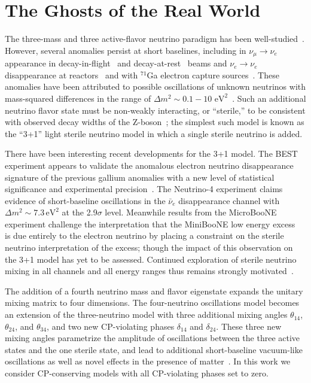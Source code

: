 \documentclass[main.tex]{subfiles}
\begin{document}
\section{The Ghosts of the Real World}
The three-mass and three active-flavor neutrino  paradigm has been well-studied~\cite{PhysRevD.98.030001,Esteban_2019,de_Salas_2018,Capozzi_2016,zboson2006, berns2021recent}.
However, several anomalies persist at short baselines, including in $\nu_\mu\rightarrow\nu_e $ appearance in decay-in-flight~\cite{aguilar2018significant} and decay-at-rest~\cite{Athanassopoulos_1998} beams  and $\nu_e\rightarrow\nu_e$ disappearance at reactors~\cite{mention2011reactor,serebrov2019first}  and with $^{71}$Ga electron capture sources~\cite{PhysRevC.73.045805,giunti2011statistical}.  
These anomalies have been attributed to possible oscillations of unknown neutrinos with mass-squared differences in the range of $\Delta m^{2}\sim 0.1-10\text{ eV}^{2}$~\cite{abazajian2012light}.   
Such an additional neutrino flavor state must be non-weakly interacting, or ``sterile,'' to be consistent with observed decay widths of the Z-boson~\cite{zboson2006}; the simplest such model is known as the ``3+1'' light sterile neutrino model in which a single sterile neutrino is added. 

There have been interesting recent developments for the 3+1 model.  
The BEST experiment appears to validate the anomalous electron neutrino disappearance signature of the previous gallium anomalies with a new level of statistical significance and experimental precision~\cite{barinov2021results}. 
The Neutrino-4 experiment claims evidence of short-baseline oscillations in the $\bar{\nu}_e$ disappearance channel with $\Delta m^2\sim 7.3\,\mathrm{eV}^2$ at the 2.9$\sigma$ level.
 Meanwhile results from the MicroBooNE~\cite{microboonecollaboration2021search,microboonecollaboration2021search1,microboonecollaboration2021searchmulti} experiment challenge the interpretation that the MiniBooNE low energy excess~\cite{miniboone2018} is due entirely to the electron neutrino by placing a constraint on the sterile neutrino interpretation of the excess; though the impact of this observation on the 3+1 model has yet to be assessed.  Continued exploration of sterile neutrino mixing in all channels and all energy ranges thus remains strongly motivated~\cite{sbnfermilab}.

The addition of a fourth neutrino mass and flavor eigenstate expands the unitary mixing matrix to four dimensions. 
The four-neutrino oscillations model becomes an extension of the three-neutrino model with three additional mixing angles $\theta_{14}$, $\theta_{24}$, and $\theta_{34}$, and two new CP-violating phases $\delta_{14}$ and $\delta_{24}$. These three new mixing angles parametrize the amplitude of oscillations between the three active states and the one sterile state, and lead to additional short-baseline vacuum-like oscillations as well as novel effects in the presence of matter~\cite{Akhmedov:1988kd,KRASTEV1989341,Chizhov:1998ug, Chizhov_1999, Akhmedov_2000, Nunokawa:2003ep,Petcov:2016iiu}.  In this work we consider CP-conserving models with all CP-violating phases set to zero.
\end{document}

